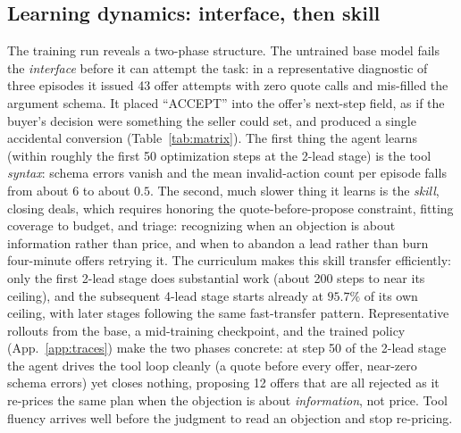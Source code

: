 \documentclass{article} %
\begin{document}
\subsection{Learning dynamics: interface, then skill}
\label{sec:dynamics}
The training run reveals a two-phase structure. The untrained base
model fails the \emph{interface} before it can attempt the task: in a representative diagnostic of three episodes it
issued 43 offer attempts with zero quote calls and mis-filled the argument schema. It placed ``ACCEPT'' into the
offer's next-step field, as if the buyer's decision were something the seller could set, and produced a single accidental
conversion (Table~\ref{tab:matrix}). The first thing the agent learns (within roughly the first 50 optimization steps at the
2-lead stage) is the tool \emph{syntax}: schema errors vanish and the mean invalid-action count per episode falls
from about $6$ to about $0.5$. The second, much slower thing it learns is the \emph{skill}, closing deals, which
requires honoring the quote-before-propose constraint, fitting coverage to budget, and triage: recognizing when an
objection is about information rather than price, and when to abandon a lead rather than burn four-minute offers
retrying it. The curriculum makes this skill transfer efficiently: only the first 2-lead stage does substantial work
(about 200 steps to near its ceiling), and the subsequent 4-lead stage starts already at $95.7\%$ of its own ceiling,
with later stages following the same fast-transfer pattern. Representative rollouts from the base, a mid-training checkpoint, and the trained policy
(App.~\ref{app:traces}) make the two phases concrete: at step 50 of the 2-lead stage the agent drives the tool loop
cleanly (a quote before every offer, near-zero schema errors) yet closes nothing, proposing 12 offers that are all
rejected as it re-prices the same plan when the objection is about \emph{information}, not price. Tool fluency arrives
well before the judgment to read an objection and stop re-pricing.
\end{document}
